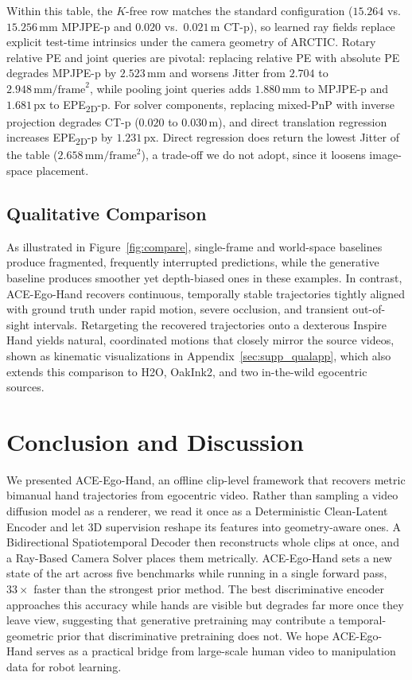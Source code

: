 \documentclass[10pt,twocolumn,letterpaper]{article}
\newcommand{\method}{ACE-Ego-Hand} %
\begin{document}
Within this table, the $K$-free row matches the standard configuration ($15.264$ vs.\ $15.256$\,mm MPJPE-p and $0.020$ vs.\ $0.021$\,m CT-p), so learned ray fields replace explicit test-time intrinsics under the camera geometry of ARCTIC. Rotary relative PE and joint queries are pivotal: replacing relative PE with absolute PE degrades MPJPE-p by $2.523\,\mathrm{mm}$ and worsens Jitter from $2.704$ to $2.948\,\mathrm{mm}/\mathrm{frame}^2$, while pooling joint queries adds $1.880\,\mathrm{mm}$ to MPJPE-p and $1.681\,\mathrm{px}$ to EPE\textsubscript{2D}-p. For solver components, replacing mixed-PnP with inverse projection degrades CT-p ($0.020$ to $0.030\,\mathrm{m}$), and direct translation regression increases EPE\textsubscript{2D}-p by $1.231\,\mathrm{px}$. Direct regression does return the lowest Jitter of the table ($2.658\,\mathrm{mm}/\mathrm{frame}^2$), a trade-off we do not adopt, since it loosens image-space placement.

\subsection{Qualitative Comparison}
As illustrated in Figure~\ref{fig:compare}, single-frame and world-space baselines produce fragmented, frequently interrupted predictions, while the generative baseline produces smoother yet depth-biased ones in these examples. In contrast, \method{} recovers continuous, temporally stable trajectories tightly aligned with ground truth under rapid motion, severe occlusion, and transient out-of-sight intervals. Retargeting the recovered trajectories onto a dexterous Inspire Hand yields natural, coordinated motions that closely mirror the source videos, shown as kinematic visualizations in Appendix~\ref{sec:supp_qualapp}, which also extends this comparison to H2O, OakInk2, and two in-the-wild egocentric sources.

\section{Conclusion and Discussion}

We presented \method{}, an offline clip-level framework that recovers metric bimanual hand trajectories from egocentric video. Rather than sampling a video diffusion model as a renderer, we read it once as a Deterministic Clean-Latent Encoder and let 3D supervision reshape its features into geometry-aware ones. A Bidirectional Spatiotemporal Decoder then reconstructs whole clips at once, and a Ray-Based Camera Solver places them metrically. \method{} sets a new state of the art across five benchmarks while running in a single forward pass, $33\times$ faster than the strongest prior method. The best discriminative encoder approaches this accuracy while hands are visible but degrades far more once they leave view, suggesting that generative pretraining may contribute a temporal-geometric prior that discriminative pretraining does not. We hope \method{} serves as a practical bridge from large-scale human video to manipulation data for robot learning.
\end{document}
